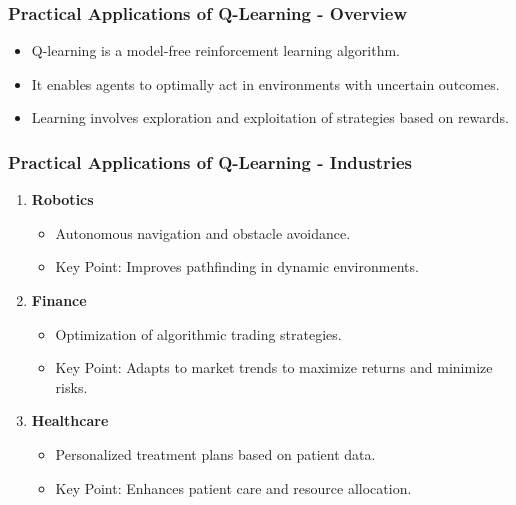 \documentclass{beamer}
\begin{document}
\begin{frame}[fragile]
    \frametitle{Practical Applications of Q-Learning - Overview}
    \begin{itemize}
        \item Q-learning is a model-free reinforcement learning algorithm.
        \item It enables agents to optimally act in environments with uncertain outcomes.
        \item Learning involves exploration and exploitation of strategies based on rewards.
    \end{itemize}
\end{frame}

\begin{frame}[fragile]
    \frametitle{Practical Applications of Q-Learning - Industries}
    \begin{enumerate}
        \item \textbf{Robotics}
            \begin{itemize}
                \item Autonomous navigation and obstacle avoidance.
                \item Key Point: Improves pathfinding in dynamic environments.
            \end{itemize}
        \item \textbf{Finance}
            \begin{itemize}
                \item Optimization of algorithmic trading strategies.
                \item Key Point: Adapts to market trends to maximize returns and minimize risks.
            \end{itemize}
        \item \textbf{Healthcare}
            \begin{itemize}
                \item Personalized treatment plans based on patient data.
                \item Key Point: Enhances patient care and resource allocation.
            \end{itemize}
    \end{enumerate}
\end{frame}
\end{document}
